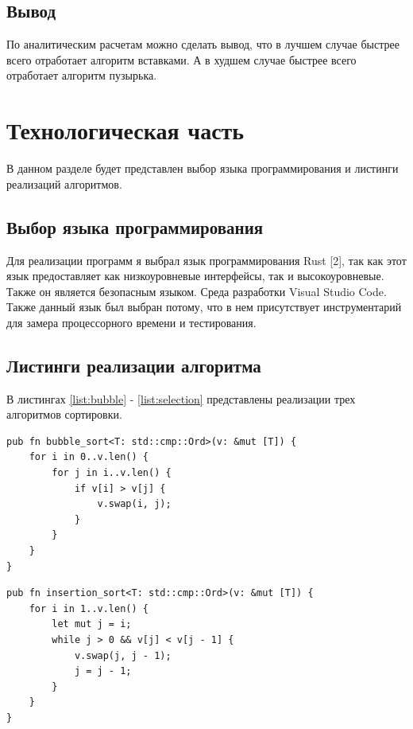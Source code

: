 \documentclass[14pt,russian]{scrartcl}
\begin{document}
\subsection{Вывод}

По аналитическим расчетам можно сделать вывод, что в лучшем случае быстрее всего отработает алгоритм вставками.
А в худшем случае быстрее всего отработает алгоритм пузырька.

\section{Технологическая часть}

В данном разделе будет представлен выбор языка программирования и листинги реализаций алгоритмов.

\subsection{Выбор языка программирования}
Для реализации программ я выбрал язык программирования Rust [2], так как этот язык предоставляет как низкоуровневые интерфейсы, так и высокоуровневые. Также он является безопасным языком. Среда разработки Visual Studio Code. Также данный язык был выбран потому, что в нем присутствует инструментарий для замера процессорного времени и тестирования.

\subsection{Листинги реализации алгоритма}

В листингах \ref{list:bubble} - \ref{list:selection} представлены реализации трех алгоритмов сортировки.

\begin{lstlisting}[label=list:bubble, caption=Функция сортировки массива методом пузырька]
pub fn bubble_sort<T: std::cmp::Ord>(v: &mut [T]) {
    for i in 0..v.len() {
        for j in i..v.len() {
            if v[i] > v[j] {
                v.swap(i, j);
            }
        }
    }
}
\end{lstlisting}

\begin{lstlisting}[label=list:insertion, caption=Функция сортировки массива методом вставок]
pub fn insertion_sort<T: std::cmp::Ord>(v: &mut [T]) {
    for i in 1..v.len() {
        let mut j = i;
        while j > 0 && v[j] < v[j - 1] {
            v.swap(j, j - 1);
            j = j - 1;
        }
    }
}
\end{lstlisting}
\end{document}
